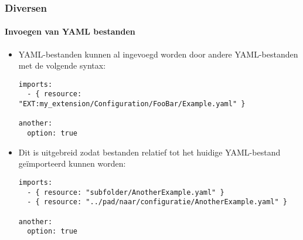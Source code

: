 \begin{frame}[fragile]
	\frametitle{Diversen}
	\framesubtitle{Invoegen van YAML bestanden}

	\lstset{basicstyle=\tiny\ttfamily}

	\begin{itemize}
		\item YAML-bestanden kunnen al ingevoegd worden door andere YAML-bestanden met de volgende syntax:

\begin{lstlisting}
imports:
  - { resource: "EXT:my_extension/Configuration/FooBar/Example.yaml" }

another:
  option: true
\end{lstlisting}

		\item Dit is uitgebreid zodat bestanden relatief tot het huidige YAML-bestand geïmporteerd kunnen worden:

\begin{lstlisting}
imports:
  - { resource: "subfolder/AnotherExample.yaml" }
  - { resource: "../pad/naar/configuratie/AnotherExample.yaml" }

another:
  option: true
\end{lstlisting}

	\end{itemize}

\end{frame}

